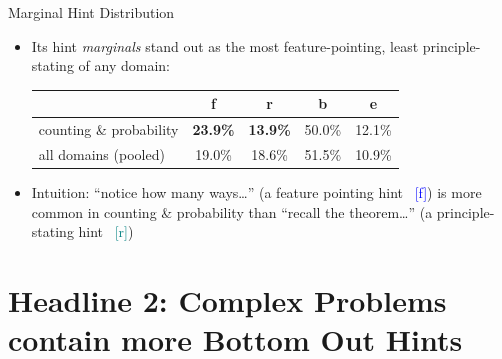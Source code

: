 \documentclass[10pt,aspectratio=169]{beamer}
\newcommand{\hf}{\textcolor{blue}{[f]}}
\newcommand{\hr}{\textcolor{teal}{[r]}}
\begin{document}
\begin{frame}{Marginal Hint Distribution}
  \begin{itemize}
    \item Its hint \emph{marginals} stand out as the most feature-pointing, least principle-stating of any domain: 
      \begin{center}
        \small
        \begin{tabular}{lcccc}
          \toprule
          & f & r & b & e \\
          \midrule
          counting \& probability & \textbf{23.9\%} & \textbf{13.9\%} & 50.0\% & 12.1\% \\
          all domains (pooled)    & 19.0\% & 18.6\% & 51.5\% & 10.9\% \\
          \bottomrule
        \end{tabular}
      \end{center}
      \pause 
      \medskip 
    \item Intuition: ``notice how many ways\ldots'' (a feature pointing hint ~\hf) is more common in counting \& probability than ``recall the theorem\ldots'' (a principle-stating hint ~\hr)
  \end{itemize}
\end{frame}

\section{Headline 2: Complex Problems contain more Bottom Out Hints}
\end{document}
